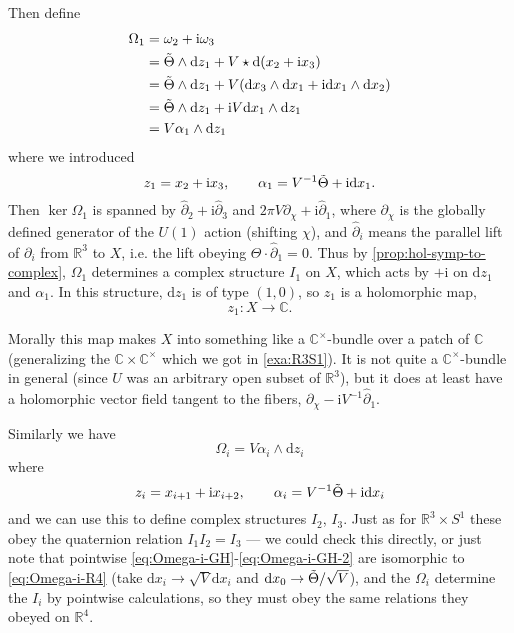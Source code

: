 \documentclass[12pt,letterpaper,reqno]{article}
\numberwithin{equation}{section}
\newcommand{\R}{\ensuremath{\mathbb R}}
\newcommand{\C}{\ensuremath{\mathbb C}}
\newcommand{\I}{{\mathrm i}}
\newcommand{\de}{\mathrm{d}}
\begin{document}
\begin{example}
Then define
\begin{align}
  \Omega_1 &= \omega_2 + \I \omega_3 \\
  &= \tTheta \wedge \de z_1 +  V \star \de(x_2 + \I x_3)\\
  &= \tTheta \wedge \de z_1 +  V (\de x_3 \wedge \de x_1 + \I \de x_1 \wedge \de x_2)\\
  &= \tTheta \wedge \de z_1 + \I V \de x_1 \wedge \de z_1 \\
  &= V \alpha_1 \wedge \de z_1
\end{align}
where we introduced
\begin{equation} \label{eq:hol-forms-GH}
  z_1 = x_2 + \I x_3, \qquad 
  \alpha_1 = V^{-1} \tTheta + \I \de x_1.
\end{equation}
Then $\ker \Omega_1$ is spanned by $\hat\partial_2 + \I \hat\partial_3$
and $2 \pi V \partial_\chi + \I \hat\partial_1$, where $\partial_\chi$ 
is the globally defined generator of the $U(1)$ action 
(shifting $\chi$),  and $\hat \partial_i$ means
the parallel lift of $\partial_i$ from $\R^3$ to $X$, i.e. the lift
obeying $\Theta \cdot \hat\partial_1 = 0$. Thus
by \autoref{prop:hol-symp-to-complex}, $\Omega_1$ 
determines a complex structure $I_1$ on $X$, which acts
by $+\I$ on $\de z_1$ and $\alpha_1$.
In this structure, $\de z_1$ is of type $(1,0)$, so
$z_1$ is a holomorphic map,
\begin{equation}
  z_1: X \to \C.
\end{equation}

Morally this map makes $X$ into something like 
a $\C^\times$-bundle over a patch of $\C$ (generalizing
the $\C\times\C^\times$ which we got in \autoref{exa:R3S1}).
It is not quite a $\C^\times$-bundle in general
(since $U$ was an arbitrary open subset of $\R^3$), 
but it does at least have 
a holomorphic vector field tangent to the fibers,
$\partial_\chi - \I V^{-1} \hat \partial_1$.

Similarly we have
\begin{equation} \label{eq:Omega-i-GH}
  \Omega_i = V \alpha_i \wedge \de z_i
\end{equation}
where
\begin{equation} \label{eq:Omega-i-GH-2}
  z_i = x_{i+1} + \I x_{i+2}, \qquad \alpha_i = V^{-1} \tTheta + \I \de x_i
\end{equation}
and we can use this to define complex structures $I_2$, $I_3$.
Just as for $\R^3 \times S^1$ these obey the quaternion
relation $I_1 I_2 = I_3$ --- we could check this directly, 
or just note that pointwise \eqref{eq:Omega-i-GH}-\eqref{eq:Omega-i-GH-2}
are isomorphic to \eqref{eq:Omega-i-R4}
(take $\de x_i \to \sqrt{V} \de x_i$ and $\de x_0 \to \tTheta / \sqrt{V}$),
and the $\Omega_i$ determine the $I_i$ by pointwise calculations,
so they must obey the same relations they obeyed on $\R^4$.


\end{example}
\end{document}
